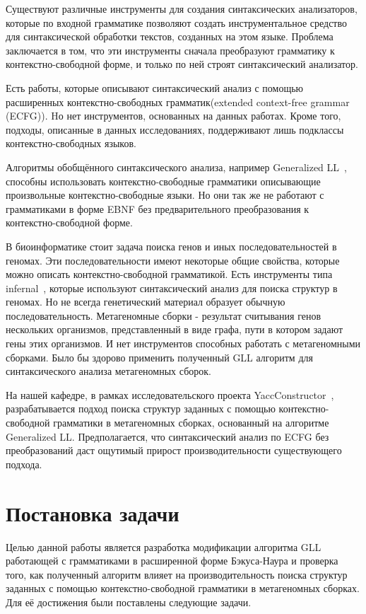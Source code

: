 \documentclass[14pt]{matmex-diploma-custom}
\begin{document}
	Существуют различные инструменты для создания синтаксических анализаторов, которые 
	по входной грамматике позволяют создать инструментальное средство для синтаксической 
	обработки текстов, созданных на этом языке. Проблема заключается в том, что эти инструменты
	сначала преобразуют грамматику к контекстно-свободной форме, и только по ней 
	строят синтаксический анализатор.
	
	Есть работы, которые описывают синтаксический анализ с помощью расширенных
	контекстно-свободных грамматик(extended context-free grammar (ECFG)).
	Hо нет инструментов, основанных на данных работах. Кроме того, подходы, описанные
	в данных исследованиях, поддерживают лишь подклассы контекстно-свободных языков.
	
	Алгоритмы обобщённого синтаксического анализа, например Generalized LL~\cite{scott2010gll}, 
	способны использовать контекстно-свободные грамматики описывающие произвольные 
	контекстно-свободные языки. Но они так же не работают с грамматиками в форме EBNF 
	без предварительного преобразования к контекстно-свободной форме.
	
	В биоинформатике стоит задача поиска генов и иных последовательностей в геномах. 
	Эти последовательности имеют некоторые общие свойства, которые можно описать 
	контекстно-свободной грамматикой. Есть инструменты типа infernal~\cite{Infernal}, которые 
	используют синтаксический анализ для поиска структур в геномах. Но не всегда 
	генетический материал образует обычную последовательность. Метагеномные сборки - 
	результат считывания генов нескольких организмов, представленный в виде графа, пути 
	в котором задают гены этих организмов. И нет инструментов способных работать с 
	метагеномными сборками. Было бы здорово применить полученный GLL алгоритм для
	синтаксического анализа метагеномных сборок.
	
	На нашей кафедре, в рамках исследовательского проекта YaccConstructor~\cite{YaccConstructor},
	разрабатывается подход поиска структур заданных с помощью контекстно-свободной
	грамматики в метагеномных сборках, основанный на алгоритме Generalized LL.
	Предполагается, что синтаксический анализ по ECFG без преобразований даст ощутимый
	прирост производительности существующего подхода.
	
	\section{Постановка задачи}
	
	Целью данной работы является разработка модификации алгоритма GLL работающей с 
	грамматиками в расширенной форме Бэкуса-Наура и проверка того, как полученный 
	алгоритм влияет на производительность поиска структур заданных с помощью 
	контекстно-свободной грамматики в метагеномных сборках. Для её достижения были 
	поставлены следующие задачи.
	
\end{document}
